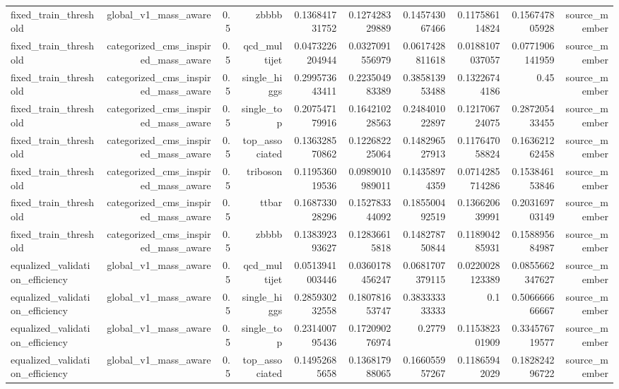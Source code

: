 \begin{table}[htbp]
{\begin{tabular}{lrrrrrrrrr}
fixed\_train\_threshold & global\_v1\_mass\_aware & 0.5 & zbbbb & 0.136841731752 & 0.127428329889 & 0.145743067466 & 0.117586114824 & 0.156747805928 & source\_member \\
fixed\_train\_threshold & categorized\_cms\_inspired\_mass\_aware & 0.5 & qcd\_multijet & 0.0473226204944 & 0.0327091556979 & 0.0617428811618 & 0.0188107037057 & 0.0771906141959 & source\_member \\
fixed\_train\_threshold & categorized\_cms\_inspired\_mass\_aware & 0.5 & single\_higgs & 0.299573643411 & 0.223504983389 & 0.385813953488 & 0.13226744186 & 0.45 & source\_member \\
fixed\_train\_threshold & categorized\_cms\_inspired\_mass\_aware & 0.5 & single\_top & 0.207547179916 & 0.164210228563 & 0.248401022897 & 0.121706724075 & 0.287205433455 & source\_member \\
fixed\_train\_threshold & categorized\_cms\_inspired\_mass\_aware & 0.5 & top\_associated & 0.136328570862 & 0.122682225064 & 0.148296527913 & 0.117647058824 & 0.163621262458 & source\_member \\
fixed\_train\_threshold & categorized\_cms\_inspired\_mass\_aware & 0.5 & triboson & 0.119536019536 & 0.0989010989011 & 0.14358974359 & 0.0714285714286 & 0.153846153846 & source\_member \\
fixed\_train\_threshold & categorized\_cms\_inspired\_mass\_aware & 0.5 & ttbar & 0.168733028296 & 0.152783344092 & 0.185500492519 & 0.136620639991 & 0.203169703149 & source\_member \\
fixed\_train\_threshold & categorized\_cms\_inspired\_mass\_aware & 0.5 & zbbbb & 0.138392393627 & 0.12836615818 & 0.148278750844 & 0.118904285931 & 0.158895684987 & source\_member \\
equalized\_validation\_efficiency & global\_v1\_mass\_aware & 0.5 & qcd\_multijet & 0.0513941003446 & 0.0360178456247 & 0.0681707379115 & 0.0220028123389 & 0.0855662347627 & source\_member \\
equalized\_validation\_efficiency & global\_v1\_mass\_aware & 0.5 & single\_higgs & 0.285930232558 & 0.180781653747 & 0.383333333333 & 0.1 & 0.506666666667 & source\_member \\
equalized\_validation\_efficiency & global\_v1\_mass\_aware & 0.5 & single\_top & 0.231400795436 & 0.172090276974 & 0.2779 & 0.115382301909 & 0.334576719577 & source\_member \\
equalized\_validation\_efficiency & global\_v1\_mass\_aware & 0.5 & top\_associated & 0.14952685658 & 0.136817988065 & 0.166055957267 & 0.11865942029 & 0.182824296722 & source\_member \\

\end{tabular}}
\end{table}
